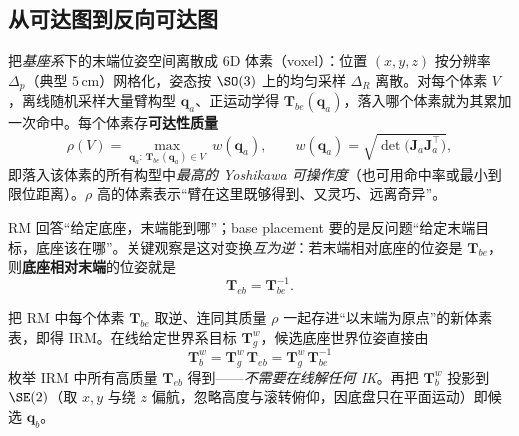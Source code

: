 \subsection{从可达图到反向可达图}
\label{sec:mmk-rm-irm}

\begin{definition}[可达图 RM]\label{def:mmk-rm}
把\emph{基座系}下的末端位姿空间离散成 $6$D 体素（voxel）：位置 $(x,y,z)$ 按分辨率 $\Delta_p$（典型 $5\,$cm）网格化，姿态按 $\SO(3)$ 上的均匀采样 $\Delta_R$ 离散。对每个体素 $V$，离线随机采样大量臂构型 $\mathbf{q}_a$、正运动学得 $\mathbf{T}_{be}(\mathbf{q}_a)$，落入哪个体素就为其累加一次命中。每个体素存\textbf{可达性质量}
\begin{equation}
  \rho(V)=\max_{\mathbf{q}_a:\,\mathbf{T}_{be}(\mathbf{q}_a)\in V}\ w(\mathbf{q}_a),\qquad
  w(\mathbf{q}_a)=\sqrt{\det\!\big(\mathbf{J}_a\mathbf{J}_a^\top\big)},
  \label{eq:mmk-rho}
\end{equation}
即落入该体素的所有构型中\emph{最高的 Yoshikawa 可操作度}（也可用命中率或最小到限位距离）。$\rho$ 高的体素表示“臂在这里既够得到、又灵巧、远离奇异”。
\end{definition}

RM 回答“给定底座，末端能到哪”；base placement 要的是反问题“给定末端目标，底座该在哪”。关键观察是这对变换\emph{互为逆}：若末端相对底座的位姿是 $\mathbf{T}_{be}$，则\textbf{底座相对末端}的位姿就是
\begin{equation}
  \mathbf{T}_{eb}=\mathbf{T}_{be}^{-1}.
  \label{eq:mmk-Teb}
\end{equation}

\begin{definition}\label{def:mmk-irm}
把 RM 中每个体素 $\mathbf{T}_{be}$ 取逆、连同其质量 $\rho$ 一起存进“以末端为原点”的新体素表，即得 IRM。在线给定世界系目标 $\mathbf{T}_g^w$，候选底座世界位姿直接由
\begin{equation}
  \boxed{\;\mathbf{T}_b^w=\mathbf{T}_g^w\,\mathbf{T}_{eb}=\mathbf{T}_g^w\,\mathbf{T}_{be}^{-1}\;}
  \label{eq:mmk-Tbw}
\end{equation}
枚举 IRM 中所有高质量 $\mathbf{T}_{eb}$ 得到——\emph{不需要在线解任何 IK}。再把 $\mathbf{T}_b^w$ 投影到 $\SE(2)$（取 $x,y$ 与绕 $z$ 偏航，忽略高度与滚转俯仰，因底盘只在平面运动）即候选 $\mathbf{q}_b$。
\end{definition}

